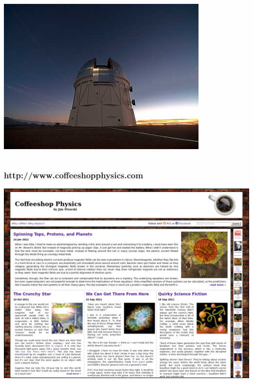 \documentclass[compress]{beamer}
\begin{document}
\begin{frame}
\begin{columns}
\includegraphics[width=0.9\linewidth]{pictures/blanco.jpg}
\end{columns}
\end{frame}

\begin{frame}
\frametitle{http://www.coffeeshopphysics.com}

\vspace{0.25 cm}
\includegraphics[width=\linewidth]{pictures/coffeeshopphysics.png}
\label{numpages}
\end{frame}
\end{document}

